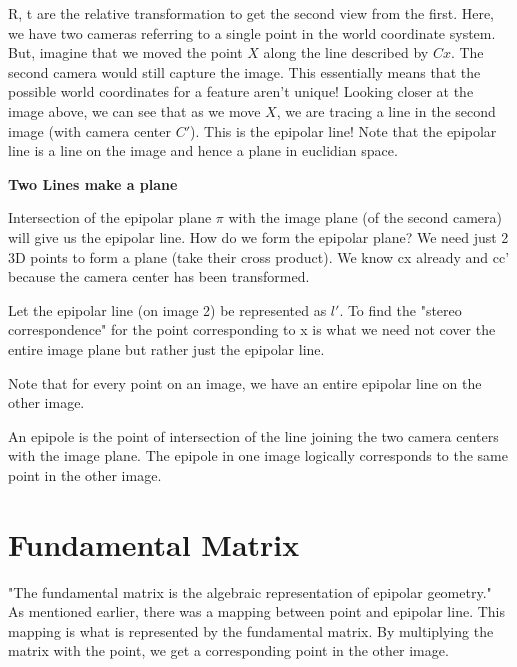 R, t are the relative transformation to get the second view from the first. Here, we have two cameras referring to a single point in the world coordinate system. But, imagine that we moved the point $X$ along the line described by $Cx$. The second camera would still capture the image. This essentially means that the possible world coordinates for a feature aren't unique! Looking closer at the image above, we can see that as we move $X$, we are tracing a line in the second image (with camera center $C'$). This is the epipolar line! Note that the epipolar line is a line on the image and hence a plane in euclidian space.

\textbf{Two Lines make a plane}

Intersection of the epipolar plane $\pi$ with the image plane (of the second camera) will give us the epipolar line. How do we form the epipolar plane? We need just 2 3D points to form a plane (take their cross product). We know cx already and cc' because the camera center has been transformed.

Let the epipolar line (on image 2) be represented as $l'$. To find the "stereo correspondence" for the point corresponding to x is what we need not cover the entire image plane but rather just the epipolar line.

Note that for every point on an image, we have an entire epipolar line on the other image.

An epipole is the point of intersection of the line joining the two camera centers with the image plane. The epipole in one image logically corresponds to the same point in the other image. 

\section{Fundamental Matrix}

"The fundamental matrix is the algebraic representation of epipolar geometry." As mentioned earlier, there was a mapping between point and epipolar line. This mapping is what is represented by the fundamental matrix. By multiplying the matrix with the point, we get a corresponding point in the other image.

